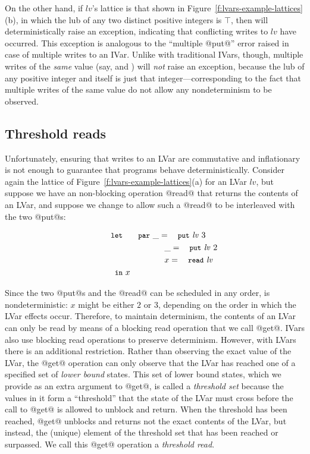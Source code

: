 On the other hand, if $\mathit{lv}$'s lattice is that shown in
Figure~\ref{f:lvars-example-lattices}(b), in which the lub of any two
distinct positive integers is $\top$, then 
will deterministically raise an exception, indicating that conflicting
writes to $\mathit{lv}$ have occurred.  This exception is analogous to
the ``multiple @put@'' error raised in case of multiple writes to an
IVar.  Unlike with traditional IVars, though, multiple writes of the
\emph{same} value (say,  and
) will \emph{not} raise an exception, because
the lub of any positive integer and itself is just that
integer---corresponding to the fact that multiple writes of the same
value do not allow any nondeterminism to be observed.

\subsection{Threshold reads}

Unfortunately, ensuring that writes to an LVar are commutative and
inflationary is not enough to guarantee that programs behave
deterministically.  Consider again the lattice of
Figure~\ref{f:lvars-example-lattices}(a) for an LVar $\mathit{lv}$,
but suppose we have an non-blocking operation @read@ that returns the
contents of an LVar, and suppose we change  to
allow such a @read@ to be interleaved with the two @put@s:

\vspace{-8mm}
\singlespacing
\begin{equation}
\begin{split}
& \LETPAR ~\_ = \putexp{\mathit{lv}}{3} \\
&  \letparspace ~\_ = \putexp{\mathit{lv}}{2} \\
&  \letparspace ~x = \termfont{read}~\mathit{lv}\\
&  \letspace \IN~x
\end{split}
\label{e:lvar-example-2}
\end{equation}
\doublespacing

Since the two @put@s and the @read@ can be scheduled in any order,
 is nondeterministic: $x$ might be either $2$
or $3$, depending on the order in which the LVar effects occur.
Therefore, to maintain determinism, the contents of an LVar can only
be read by means of a blocking read operation that we call @get@.
IVars also use blocking read operations to preserve determinism.
However, with LVars there is an additional restriction.  Rather than
observing the exact value of the LVar, the @get@ operation can only
observe that the LVar has reached one of a specified set of
\emph{lower bound} states.  This set of lower bound states, which we
provide as an extra argument to @get@, is called a \emph{threshold
  set} because the values in it form a ``threshold'' that the state of
the LVar must cross before the call to @get@ is allowed to unblock and
return.  When the threshold has been reached, @get@ unblocks and
returns not the exact contents of the LVar, but instead, the (unique)
element of the threshold set that has been reached or surpassed.  We
call this @get@ operation a \emph{threshold read}.


